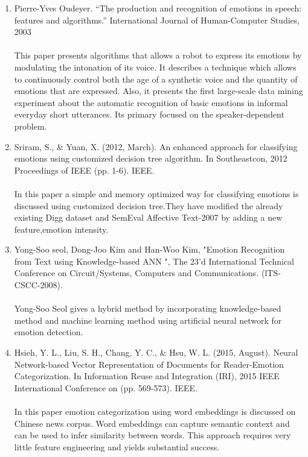 \documentclass[oneside,a4paper,12pt]{book}
\begin{document}
\begin{enumerate}
	\item[\lbrack4\rbrack] Pierre-Yves Oudeyer. “The production and recognition of emotions in speech: features and algorithms.” International Journal of Human-Computer Studies, 2003\\\\
	 This paper presents algorithms that allows a robot to express its emotions by modulating the
		intonation of its voice. It describes a technique which allows to
		continuously control both the age of a synthetic voice and the quantity of emotions that
		are expressed. Also, it presents the first large-scale data mining experiment about the
		automatic recognition of basic emotions in informal everyday short utterances. Its primary focused on
		the speaker-dependent problem.	
	\item[\lbrack5\rbrack] Sriram, S., \& Yuan, X. (2012, March). An enhanced approach for classifying emotions using customized decision tree algorithm. In Southeastcon, 2012 Proceedings of IEEE (pp. 1-6). IEEE.\\\\
	 In this paper a simple and memory optimized way for classifying emotions is discussed using customized decision tree.They have modified the already existing  Digg dataset and SemEval Affective Text-2007 by adding a new feature,emotion intensity.
	\item[\lbrack6\rbrack] Yong-Soo   seol,   Dong-Joo   Kim   and   Han-Woo   Kim,   "Emotion Recognition from Text using Knowledge-based ANN ", The 23'd International  Technical Conference  on Circuit/Systems, Computers and Communications. (lTS-CSCC-2008).\\\\
	 Yong-Soo Seol gives a hybrid method by incorporating knowledge-based method and machine learning method using artificial neural network for emotion detection.
	\item[\lbrack7\rbrack] Hsieh, Y. L., Liu, S. H., Chang, Y. C., \& Hsu, W. L. (2015, August). Neural Network-based Vector Representation of Documents for Reader-Emotion Categorization. In Information Reuse and Integration (IRI), 2015 IEEE International Conference on (pp. 569-573). IEEE.\\\\
	 In this paper emotion categorization using word embeddings is discussed on Chinese news corpus. Word embeddings can capture semantic context and can be used to infer similarity between words. This approach requires very little feature engineering and yields substantial success.
\end{enumerate}
\end{document}
